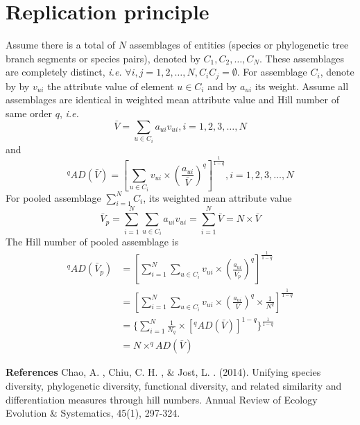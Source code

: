 \documentclass[11pt]{article}
\begin{document}
\section{Replication principle}
Assume there is a total of $N$ assemblages of entities (species or phylogenetic tree branch segments or species pairs), denoted by $C_1, C_2,\dots,C_N$. 
These assemblages are completely distinct, \textit{i.e.} $\forall i,j=1,2,\dots,N, C_iC_j = \emptyset$. 
For assemblage $C_i$, denote by by $v_{ui}$ the attribute value of element $u \in C_i$ and by $a_{ui}$ its weight. 
Assume all assemblages are identical in weighted mean attribute value and Hill number of same order $q$, \textit{i.e.}
\begin{equation}
    \bar{V} = \sum\limits_{u\in C_i}a_{ui}v_{ui}, i = 1,2,3,\dots,N
\end{equation}
and 
\begin{equation}
    ^{q}AD(\bar{V}) = [\sum\limits_{u\in C_i} v_{ui} \times (\frac{a_{ui}}{\bar{V}})^q]^{\frac{1}{1-q}}, i = 1,2,3,\dots,N
\end{equation}
For pooled assemblage $\sum\limits_{i=1}^{N}C_i$, its weighted mean attribute value 
\begin{equation}
    \bar{V}_p = \sum\limits_{i=1}^{N} \sum\limits_{u\in C_i}a_{ui}v_{ui} = \sum\limits_{i=1}^{N} \bar{V} = N \times \bar{V}
\end{equation}
The Hill number of pooled assemblage is 
\begin{equation}
    \begin{aligned}
    ^{q}AD(\bar{V}_p) & = 
    [\sum\limits_{i=1}^{N} \sum\limits_{u\in C_i} v_{ui} \times (\frac{a_{ui}}{\bar{V}_p})^q]^{\frac{1}{1-q}} \\ & =
    [\sum\limits_{i=1}^{N} \sum\limits_{u\in C_i} v_{ui} \times (\frac{a_{ui}}{\bar{V}})^q \times \frac{1}{N^q}]^{\frac{1}{1-q}} \\ & = 
    \{\sum\limits_{i=1}^{N} \frac{1}{N_q} \times [^{q}AD(\bar{V})]^{1-q}\}^{\frac{1}{1-q}} \\ &=
    N \times ^{q}AD(\bar{V})
    \end{aligned}
    \label{ReplicationPrinciple}
\end{equation}



\newpage
\textbf{References} %
\newline
[1] Chao, A. , Chiu, C. H. , & Jost, L. . (2014). Unifying species diversity, phylogenetic diversity, functional diversity, and related similarity and differentiation measures through hill numbers. Annual Review of Ecology Evolution & Systematics, 45(1), 297-324.
\end{document}
